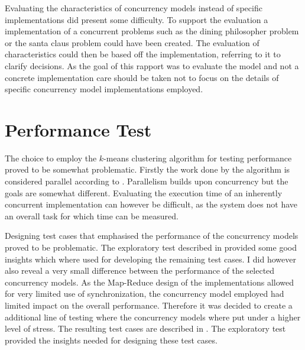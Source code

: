 Evaluating the characteristics of concurrency models instead of specific implementations did present some difficulty. To support the evaluation a implementation of a concurrent problems such as the dining philosopher problem\cite[p. 673]{hoare1978communicating} or the santa claus problem\cite{trono1994new} could have been created. The evaluation of characteristics could then be based off the implementation, referring to it to clarify decisions. As the goal of this rapport was to evaluate the model and not a concrete implementation care should be taken not to focus on the details of specific concurrency model implementations employed.

\section{Performance Test}\label{sec:reflec_perf_test}
The choice to employ the $k$-means clustering algorithm for testing performance proved to be somewhat problematic. Firstly the work done by the algorithm is considered parallel according to . Parallelism builds upon concurrency but the goals are somewhat different. Evaluating the execution time of an inherently concurrent implementation can however be difficult, as the system does not have an overall task for which time can be measured.

Designing test cases that emphasised the performance of the concurrency models proved to be problematic. The exploratory test described in  provided some good insights which where used for developing the remaining test cases. I did however also reveal a very small difference between the performance of the selected concurrency models. As the Map-Reduce design of the implementations allowed for very limited use of synchronization, the concurrency model employed had limited impact on the overall performance. Therefore it was decided to create a additional line of testing where the concurrency models where put under a higher level of stress. The resulting test cases are described in . The exploratory test provided the insights needed for designing these test cases.

